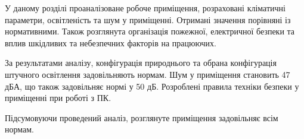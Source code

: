    У даному розділі проаналізоване робоче приміщення, розраховані кліматичні параметри, освітленість та шум у приміщенні. Отримані значення порівняні із нормативними. Також розглянута організація пожежної, електричної безпеки та вплив шкідливих та небезпечних факторів на працюючих.

    За результатами аналізу, конфігурація природнього та обрана конфігурація штучного освітлення задовільняють нормам.
    Шум у приміщення становить 47 дБА, що також задовільняє нормі у 50 дБ.
    Розроблені правила техніки безпеки у приміщенні при роботі з ПК.

    Підсумовуючи проведений аналіз, розглянуте приміщення задовільняє всім нормам.
